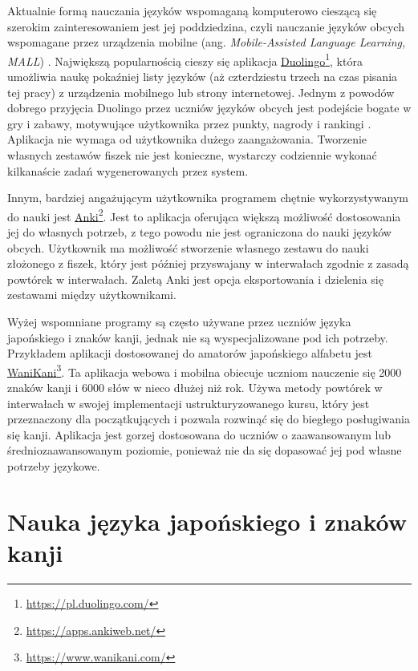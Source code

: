 \documentclass[a4paper,twoside,12pt]{book}
\newcommand{\obcy}[1]{\emph{#1}}
\newcommand{\english}[1]{{\selectlanguage{british}\obcy{#1}}}
\begin{document}
Aktualnie formą nauczania języków wspomaganą komputerowo cieszącą się szerokim zainteresowaniem jest jej poddziedzina, czyli nauczanie języków obcych wspomagane przez urządzenia mobilne (ang. \english{Mobile-Assisted Language Learning, MALL}) \cite{bib:artykulDuolingo}. Największą popularnością \cite{bib:internetDuolingo,bib:artykulDuolingo} cieszy się aplikacja \href{https://pl.duolingo.com/}{Duolingo}\footnote{\url{https://pl.duolingo.com/}}, która umożliwia naukę pokaźniej listy języków (aż czterdziestu trzech na czas pisania tej pracy) z urządzenia mobilnego lub strony internetowej. Jednym z powodów dobrego przyjęcia Duolingo przez uczniów języków obcych jest podejście bogate w gry i zabawy, motywujące użytkownika przez punkty, nagrody i rankingi \cite{bib:artykulDuolingo}. Aplikacja nie wymaga od użytkownika dużego zaangażowania. Tworzenie własnych zestawów fiszek nie jest konieczne, wystarczy codziennie wykonać kilkanaście zadań wygenerowanych przez system. 

Innym, bardziej angażującym użytkownika programem chętnie wykorzystywanym do nauki jest \href{https://apps.ankiweb.net/}{Anki}\footnote{\url{https://apps.ankiweb.net/}}. Jest to aplikacja oferująca większą możliwość dostosowania jej do własnych potrzeb, z tego powodu nie jest ograniczona do nauki języków obcych. Użytkownik ma możliwość stworzenie własnego zestawu do nauki złożonego z fiszek, który jest później przyswajany w interwałach zgodnie z zasadą powtórek w interwałach. Zaletą Anki jest opcja eksportowania i dzielenia się zestawami między użytkownikami. 

Wyżej wspomniane programy są często używane przez uczniów języka japońskiego i znaków kanji, jednak nie są wyspecjalizowane pod ich potrzeby. Przykładem aplikacji dostosowanej do amatorów japońskiego alfabetu jest \href{https://www.wanikani.com/}{WaniKani}\footnote{\url{https://www.wanikani.com/}}. Ta aplikacja webowa i mobilna obiecuje uczniom nauczenie się 2000 znaków kanji i 6000 słów w nieco dłużej niż rok. Używa metody powtórek w interwałach w swojej implementacji ustrukturyzowanego kursu, który jest przeznaczony dla początkujących i pozwala rozwinąć się do biegłego posługiwania się kanji. Aplikacja jest gorzej dostosowana do uczniów o zaawansowanym lub średniozaawansowanym poziomie, ponieważ nie da się dopasować jej pod własne potrzeby językowe. 

\section{Nauka języka japońskiego i znaków kanji}
\end{document}
